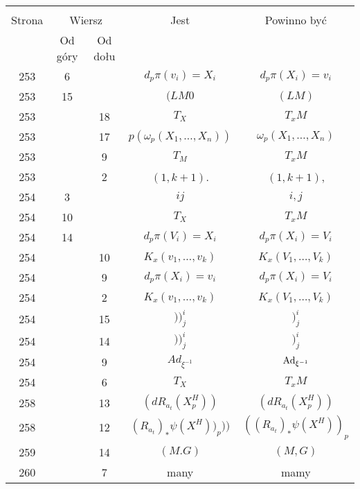 \documentclass[a4paper,11pt]{article}
\begin{document}
\begin{center}
  \begin{tabular}{|c|c|c|c|c|}
    \hline
    & \multicolumn{2}{c|}{} & & \\
    Strona & \multicolumn{2}{c|}{Wiersz} & Jest
                              & Powinno być \\ \cline{2-3}
    & Od góry & Od dołu & & \\
    \hline
        253 &  6 & & $d_{ p } \pi( v_{ i } ) = X_ { i }$
           & $d_{ p } \pi( X_{ i }) = v_ { i }$ \\
    253 & 15 & & $( LM 0$ & $( LM )$ \\
    253 & & 18 & $T_{ X }$ & $T_{ x }M$ \\
    253 & & 17 & $p( \omega_{ p }( X_{ 1 }, \ldots, X_{ n } ) )$
           & $\omega_{ p }( X_{ 1 }, \ldots, X_{ n } )$ \\
    253 & &  9 & $T_{ M }$ & $T_{ x }M$ \\
    253 & &  2 & $( 1, k + 1 )$. & $( 1, k + 1 )$, \\
    254 &  3 & & $ij$ & $i, j$ \\
    254 & 10 & & $T_{ X }$ & $T_{ x }M$ \\
    254 & 14 & & $d_{ p } \pi( V_{ i } ) = X_{ i }$
           & $d_{ p } \pi( X_{ i } ) = V_{ i }$ \\
    254 & & 10 & $K_{ x }( v_{ 1 }, \ldots, v_{ k } )$
           & $K_{ x }( V_{ 1 }, \ldots, V_{ k } )$ \\
    254 & &  9 & $d_{ p } \pi( X_{ i } ) = v_{ i }$
           & $d_{ p } \pi( X_{ i } ) = V_{ i }$ \\
    254 & &  2 & $K_{ x }( v_{ 1 }, \ldots, v_{ k } )$
           & $K_{ x }( V_{ 1 }, \ldots, V_{ k } )$ \\[0.3em]
    254 & & 15 & $) )^{ i }_{ j }$ & $)^{ i }_{ j }$ \\[0.3em]
    254 & & 14 & $) )^{ i }_{ j }$ & $)^{ i }_{ j }$ \\
    254 & &  9 & $Ad_{ \xi^{ -1 } }$ & $\mathrm{Ad}_{ \xi^{ -1 } }$ \\
    254 & &  6 & $T_{ X }$ & $T_{ x }M$ \\
    258 & & 13 & $( dR_{ a_{ t } }( X_{ p }^{ H } ) )$
           & $( dR_{ a_{ t } }( X_{ p }^{ H } ) )$ \\[0.5em]
    258 & & 12 & $( R_{ a_{ t } } )_{ * } \psi( X^{ H } ) )_{ p } ) )$
           & $( ( R_{ a_{ t } } )_{ * } \psi( X^{ H } ) )_{ p }$ \\[0.3em]
    259 & & 14 & $( M. G )$ & $( M, G )$ \\
    260 & &  7 & many & mamy \\

\end{tabular}
\end{center}
\end{document}
